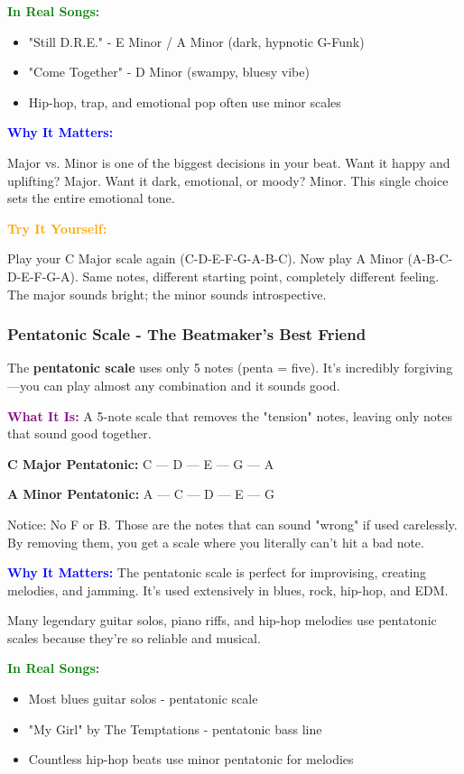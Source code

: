 \documentclass[11pt,letterpaper]{article}
\newcommand{\purple}[1]{\textcolor{purple}{\textbf{#1}}}
\newcommand{\bluepurple}[1]{\textcolor{blue}{\textbf{#1}}}
\newcommand{\greentext}[1]{\textcolor{green}{\textbf{#1}}}
\newcommand{\orangetext}[1]{\textcolor{orange}{\textbf{#1}}}
\begin{document}
\textbf{\greentext{In Real Songs:}}
\begin{itemize}[leftmargin=*]
\item "Still D.R.E." - E Minor / A Minor (dark, hypnotic G-Funk)
\item "Come Together" - D Minor (swampy, bluesy vibe)
\item Hip-hop, trap, and emotional pop often use minor scales
\end{itemize}

\textbf{\bluepurple{Why It Matters:}} 

Major vs. Minor is one of the biggest decisions in your beat. Want it happy and uplifting? Major. Want it dark, emotional, or moody? Minor. This single choice sets the entire emotional tone.

\textbf{\orangetext{Try It Yourself:}}

Play your C Major scale again (C-D-E-F-G-A-B-C). Now play A Minor (A-B-C-D-E-F-G-A). Same notes, different starting point, completely different feeling. The major sounds bright; the minor sounds introspective.

\subsubsection{Pentatonic Scale - The Beatmaker's Best Friend}

The \textbf{pentatonic scale} uses only 5 notes (penta = five). It's incredibly forgiving—you can play almost any combination and it sounds good.

\textbf{\purple{What It Is:}} A 5-note scale that removes the "tension" notes, leaving only notes that sound good together.

\textbf{C Major Pentatonic:} C — D — E — G — A

\textbf{A Minor Pentatonic:} A — C — D — E — G

Notice: No F or B. Those are the notes that can sound "wrong" if used carelessly. By removing them, you get a scale where you literally can't hit a bad note.

\textbf{\bluepurple{Why It Matters:}} The pentatonic scale is perfect for improvising, creating melodies, and jamming. It's used extensively in blues, rock, hip-hop, and EDM.

Many legendary guitar solos, piano riffs, and hip-hop melodies use pentatonic scales because they're so reliable and musical.

\textbf{\greentext{In Real Songs:}}
\begin{itemize}[leftmargin=*]
\item Most blues guitar solos - pentatonic scale
\item "My Girl" by The Temptations - pentatonic bass line
\item Countless hip-hop beats use minor pentatonic for melodies
\end{itemize}
\end{document}
